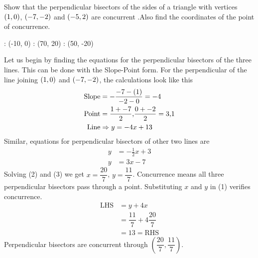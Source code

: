 \question[3] Show that the perpendicular bisectors of the sides of a triangle 
with vertices $(1 , 0 )$, $(-7 , -2)$ and 
$(-5 , 2 )$ are concurrent .Also find the coordinates of the point 
of concurrence.


\watchout

\ifprintanswers
  \begin{marginfigure}
      : (-10, 0)
      : (70, 20)
      : (50, -20)
    \figdrawbegin{}
      \figdrawline [10, 20]
      \figdrawline [20, 30]
      \figdrawline [30, 10]
    \figdrawend
    \centerline{\box\figBoxA}
  \end{marginfigure}
\fi 

\begin{solution}[\halfpage]
  Let us begin by finding the equations for the perpendicular bisectors 
  of the three lines. This can be done with the Slope-Point form.
  For the perpendicular of the line joining $(1, 0)$ and 
  $(-7, -2)$, the calculations look like this  
  \begin{align}
	\text{Slope} &= -\dfrac{-7 - (1)}
	    				   {-2 - 0} = -4  	   \nonumber \\
    \text{Point} &= \dfrac{1+-7}{2}\text{,}
    				\dfrac{0+-2}{2} = 3\text{,}1 \nonumber \\ 
    \text{Line}  &\Rightarrow y = -4x + 13
  \end{align}
  Similar, equations for perpendicular bisectors of other two lines are
  \begin{align}
  	y &= -\frac{1}{2}x + 3 \\
  	y &= 3x - 7
  \end{align}
  Solving (2) and (3) we get $x=\dfrac{20}{7}$, $y=\dfrac{11}{7}$.
  Concurrence means all three perpendicular bisectors pass through a point.
  Substituting $x$ and $y$ in (1) verifies concurrence.
  \begin{align}
  	\text{LHS} &= y + 4x \nonumber \\
  			   &= \dfrac{11}{7} + 4\dfrac{20}{7} \nonumber \\
  			   &= 13 = \text{RHS} \nonumber
  \end{align}
  Perpendicular bisectors are concurrent through 
  $(\dfrac{20}{7}, \dfrac{11}{7})$.
\end{solution}
